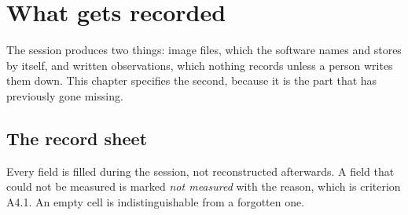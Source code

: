 \chapter{What gets recorded}
\label{chap:record}

The session produces two things: image files, which the software names and
stores by itself, and written observations, which nothing records unless a
person writes them down. This chapter specifies the second, because it is the
part that has previously gone missing.

\section{The record sheet}

Every field is filled during the session, not reconstructed afterwards. A
field that could not be measured is marked \emph{not measured} with the
reason, which is criterion A4.1. An empty cell is indistinguishable from a
forgotten one.

